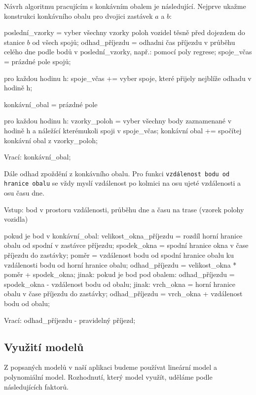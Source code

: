 \bigbreak


Návrh algoritmu pracujícím s konkávním obalem je následující. Nejprve ukažme konstrukci konkávního obalu pro dvojici zastávek $a$ a $b$:


\begin{code}[frame=none]
poslední_vzorky = vyber všechny vzorky poloh vozidel
  těsně před dojezdem do stanice $b$ od všech spojů;
odhad_příjezdu = odhadni čas příjezdu v průběhu celého
  dne podle bodů v poslední_vzorky, např.: pomocí poly regrese;
spoje_včas = prázdné pole spojů;


pro každou hodinu h:
  spoje_včas += vyber spoje, které přijely nejblíže
    odhadu v hodině h;


konkávní_obal = prázdné pole


pro každou hodinu h:
  vzorky_poloh = vyber všechny body zaznamenané
    v hodině h a náležící kterémukoli spoji v spoje_včas;
  konkávní obal += spočítej konkávní obal z vzorky_poloh;


Vrací: konkávní_obal;
\end{code}


Dále odhad zpoždění z konkávního obalu. Pro funkci \verb-vzdálenost bodu od hranice obalu- se vždy myslí vzdálenost po kolmici na osu ujeté vzdálenosti a osu času dne.


\begin{code}[frame=none]
Vstup: bod v prostoru vzdálenosti, průběhu dne
  a času na trase (vzorek polohy vozidla)


pokud je bod v konkávní_obal:
  velikost_okna_příjezdu = rozdíl horní hranice obalu od spodní
    v zastávce příjezdu;
  spodek_okna = spodní hranice okna v čase
    příjezdu do zastávky;
  poměr = vzdálenost bodu od spodní hranice obalu
ku vzdálenosti bodu od horní hranice obalu;
  odhad_příjezdu = velikost_okna * poměr + spodek_okna;
jinak:
  pokud je bod pod obalem:
    odhad_příjezdu = spodek_okna - vzdálenost bodu od obalu;
  jinak:
    vrch_okna = horní hranice obalu
  v čase příjezdu do zastávky;
    odhad_příjezdu = vrch_okna + vzdálenost bodu od obalu;


Vrací: odhad_příjezdu - pravidelný příjezd;
\end{code}


\subsection{Využití modelů}


Z popsaných modelů v naší aplikaci budeme používat lineární model a polynomiální model. Rozhodnutí, který model využít, uděláme podle následujících faktorů.


